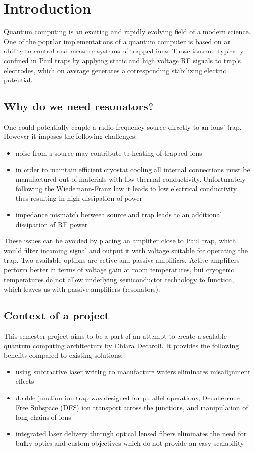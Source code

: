 \newcommand{\package}{\emph}

\chapter{Introduction}
Quantum computing is an exciting and rapidly evolving field of a modern science. One of the popular implementations of a quantum computer is based on an ability to control and measure systems of trapped ions. Those ions are typically confined in Paul \cite{Paul1990} traps by applying static and high voltage RF signals to trap's electrodes, which on average generates a corresponding stabilizing electric potential.
\section{Why do we need resonators?}
\label{sec:why_resonators}
One could potentially couple a radio frequency source directly to an ions' trap. However it imposes the following challenges:
\begin{itemize}
	\item noise from a source may contribute to heating of trapped ions \cite{Turchette2000}
	\item in order to maintain efficient cryostat cooling all internal connections must be manufactured out of materials with low thermal conductivity. Unfortunately following the Wiedemann-Franz law \cite{Franz1853} it leads to low electrical conductivity thus resulting in high dissipation of power
	\item impedance mismatch between source and trap leads to an additional dissipation of RF power
\end{itemize}
These issues can be avoided by placing an amplifier close to Paul trap, which would filter incoming signal and output it with voltage suitable for operating the trap. Two available options are active and passive amplifiers. Active amplifiers perform better in terms of voltage gain at room temperatures, but cryogenic temperatures do not allow underlying semiconductor technology to function, which leaves us with passive amplifiers (resonators).
\section{Context of a project}
\label{sec:context}
This semester project aims to be a part of an attempt to create a scalable quantum computing architecture by Chiara Decaroli. It provides the following benefits compared to existing solutions:
\begin{itemize}
	\item using subtractive laser writing to manufacture wafers eliminates misalignment effects
	\item double junction ion trap was designed for parallel operations, Decoherence Free Subspace (DFS) ion transport across the junctions, and manipulation of long chains of ions
	\item integrated laser delivery through optical lensed fibers eliminates the need for bulky optics and custom objectives which do not provide an easy scalability
\end{itemize}

